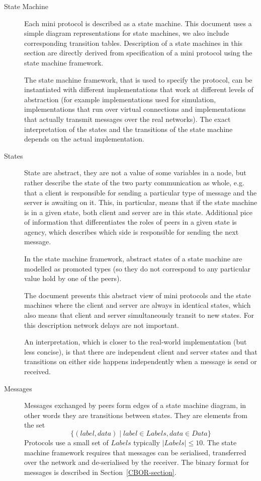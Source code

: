 \documentclass{report}
\theoremstyle{definition}{
  \newtheorem{lemma}{Lemma}[section] %
  \newtheorem{definition}[lemma]{Definition}
}
\theoremstyle{theorem}{
  \newtheorem{invariant}[lemma]{Invariant}
  \newtheorem{proofobligation}[lemma]{Proof Obligation}
}
\numberwithin{equation}{lemma}
\begin{document}
\begin{description}
\item[State Machine]
  Each mini protocol is described as a state machine.
  This document uses a simple diagram representations for state machines, we
  also include corresponding transition tables.
  Description of a state machines in this section are directly derived from
  specification of a mini protocol using the state machine framework.

  The state machine framework, that is used to specify the protocol, can be instantiated
  with different implementations that work at different levels of abstraction
  (for example implementations used for simulation, implementations that run over virtual
  connections and implementations that actually transmit messages over the real networks).
  The exact interpretation of the states and the transitions of the state machine
  depends on the actual implementation.

\item[States]
  State are abstract, they are not a value of some variables in a node, but
  rather describe the state of the two party communication as whole, e.g.
  that a client is responsible for sending a particular type of message and
  the server is awaiting on it.  This, in particular, means that if the state
  machine is in a given state, both client and server are in this state.
  Additional pice of information that differentiates the roles of peers in
  a given state is agency, which describes which side is responsible for
  sending the next message.

  In the state machine framework, abstract states of a state machine are
  modelled as promoted types (so they do not correspond to any particular
  value hold by one of the peers).

  The document presents this abstract view of mini protocols and the state
  machines where the client and server are always in identical states, which
  also means that client and server simultaneously transit to new states.
  For this description network delays are not important.

  An interpretation, which is closer to the real-world implementation (but
  less concise), is that there are independent client and server states
  and that transitions on either side happens independently when a message is send or received.
  
\item[Messages]
  Messages exchanged by peers form edges of a state machine diagram, in other
  words they are transitions between states.
  They are elements from the set
  $$\{(label, data) \mid label \in Labels, data \in Data\}$$
  Protocols use a small set of $Labels$ typically $|Labels| \leq 10$.
  The state machine framework requires that messages can be serialised,
  transferred over the network and de-serialised by the receiver.
  The binary format for messages is described in Section~\ref{CBOR-section}.


\end{description}
\end{document}
